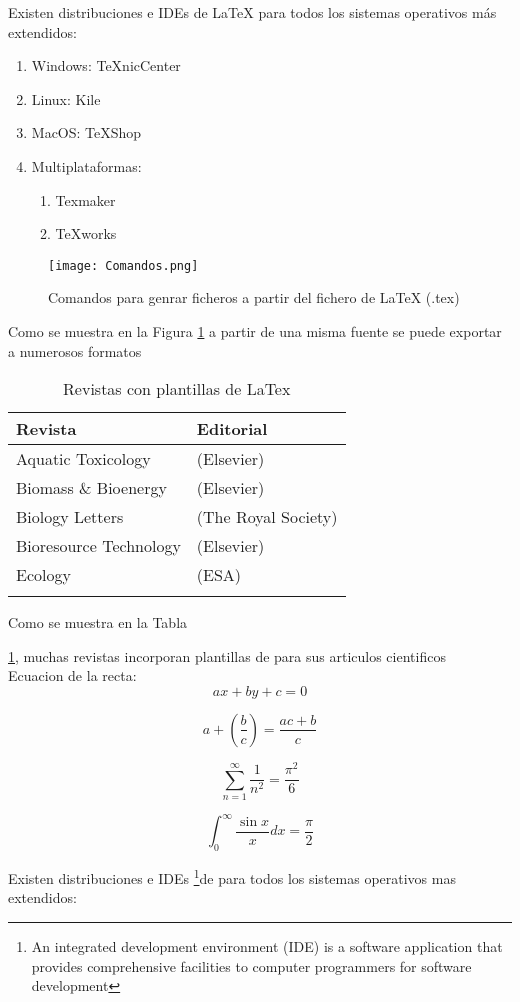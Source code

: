 \documentclass[spanish,12pt,letterpaper]{article}
\begin{document}
Existen distribuciones e IDEs de LaTeX para todos los sistemas operativos más extendidos:
\begin{enumerate}
    \item Windows: TeXnicCenter
    \item Linux: Kile
    \item MacOS: TeXShop
    \item Multiplataformas:
        \begin{enumerate} 
            \item Texmaker 
            \item TeXworks
        \end{enumerate}
\end{enumerate}
    \begin{figure}[htb]
        \centering
        \texttt{[image: Comandos.png]}
        \caption{Comandos para genrar ficheros a partir del fichero de LaTeX (.tex)}
        \label{fig:comand}%
    \end{figure}
    
Como se muestra en la Figura \ref{fig:comand} a partir de una misma fuente se puede exportar a numerosos formatos\\
 \newpage  
    \begin{table}[htb]
    \centering 
    \begin {tabular}{ll}  
        \hline
        Revista & Editorial \\
        \hline
        Aquatic Toxicology &(Elsevier)\\
        Biomass \&  Bioenergy &(Elsevier)\\
        Biology Letters &(The Royal Society)\\
        Bioresource  Technology & (Elsevier)\\
        Ecology & (ESA)\\
        \\
        \hline
        \end{tabular}
         \caption{Revistas con plantillas de LaTex}
        \label{cuad:revistas}
   \end{table}
Como se muestra en la Tabla

\ref{cuad:revistas}, muchas revistas incorporan plantillas de \LaTex para sus articulos cientificos\\

Ecuacion de la recta: $$ax+by+c=0$$


$$a  + \left(\frac{b}{c}\right) = \frac{ac+b}{c}$$

$$\sum_{n=1}^\infty\frac{1}{n^2} = \frac {\pi^2}{6}$$

$$\int_0^\infty \frac{\sin x}{x} dx = \frac{\pi}{2}$$






Existen distribuciones e IDEs \footnote {An integrated development environment (IDE) is a software application that provides comprehensive facilities to computer programmers for software development}de \LaTex para todos los sistemas operativos mas extendidos:
\end{document}
